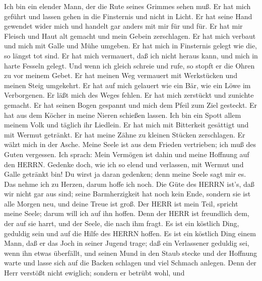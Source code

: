 Ich bin ein elender Mann, der die Rute seines Grimmes sehen
muß.  Er hat mich geführt und lassen gehen in die Finsternis
und nicht in Licht.  Er hat seine Hand gewendet wider mich
und handelt gar anders mit mir für und für.  Er hat mir
Fleisch und Haut alt gemacht und mein Gebein zerschlagen. 
Er hat mich verbaut und mich mit Galle und Mühe umgeben.  Er
hat mich in Finsternis gelegt wie die, so längst tot sind. 
Er hat mich vermauert, daß ich nicht heraus kann, und mich in harte
Fesseln gelegt.  Und wenn ich gleich schreie und rufe, so
stopft er die Ohren zu vor meinem Gebet.  Er hat meinen Weg
vermauert mit Werkstücken und meinen Steig umgekehrt.  Er
hat auf mich gelauert wie ein Bär, wie ein Löwe im Verborgenen.
 Er läßt mich des Weges fehlen. Er hat mich zerstückt und
zunichte gemacht.  Er hat seinen Bogen gespannt und mich
dem Pfeil zum Ziel gesteckt.  Er hat aus dem Köcher in
meine Nieren schießen lassen.  Ich bin ein Spott allem
meinem Volk und täglich ihr Liedlein.  Er hat mich mit
Bitterkeit gesättigt und mit Wermut getränkt.  Er hat meine
Zähne zu kleinen Stücken zerschlagen. Er wälzt mich in der Asche.
 Meine Seele ist aus dem Frieden vertrieben; ich muß des
Guten vergessen.  Ich sprach: Mein Vermögen ist dahin und
meine Hoffnung auf den HERRN.  Gedenke doch, wie ich so
elend und verlassen, mit Wermut und Galle getränkt bin!  Du
wirst ja daran gedenken; denn meine Seele sagt mir es.  Das
nehme ich zu Herzen, darum hoffe ich noch.  Die Güte des
HERRN ist's, daß wir nicht gar aus sind; seine Barmherzigkeit hat noch
kein Ende,  sondern sie ist alle Morgen neu, und deine
Treue ist groß.  Der HERR ist mein Teil, spricht meine
Seele; darum will ich auf ihn hoffen.  Denn der HERR ist
freundlich dem, der auf sie harrt, und der Seele, die nach ihm fragt.
 Es ist ein köstlich Ding, geduldig sein und auf die Hilfe
des HERRN hoffen.  Es ist ein köstlich Ding einem Mann, daß
er das Joch in seiner Jugend trage;  daß ein Verlassener
geduldig sei, wenn ihn etwas überfällt,  und seinen Mund in
den Staub stecke und der Hoffnung warte  und lasse sich auf
die Backen schlagen und viel Schmach anlegen.  Denn der
Herr verstößt nicht ewiglich;  sondern er betrübt wohl, und
